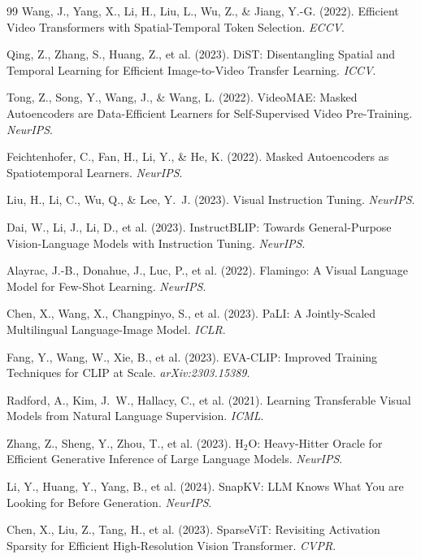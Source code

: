 \documentclass{article}
\begin{document}
{\begin{thebibliography}{99}
Wang, J., Yang, X., Li, H., Liu, L., Wu, Z., \& Jiang, Y.-G. (2022). Efficient Video Transformers with Spatial-Temporal Token Selection. \emph{ECCV}.

Qing, Z., Zhang, S., Huang, Z., et al. (2023). DiST: Disentangling Spatial and Temporal Learning for Efficient Image-to-Video Transfer Learning. \emph{ICCV}.

Tong, Z., Song, Y., Wang, J., \& Wang, L. (2022). VideoMAE: Masked Autoencoders are Data-Efficient Learners for Self-Supervised Video Pre-Training. \emph{NeurIPS}.

Feichtenhofer, C., Fan, H., Li, Y., \& He, K. (2022). Masked Autoencoders as Spatiotemporal Learners. \emph{NeurIPS}.

Liu, H., Li, C., Wu, Q., \& Lee, Y.~J. (2023). Visual Instruction Tuning. \emph{NeurIPS}.

Dai, W., Li, J., Li, D., et al. (2023). InstructBLIP: Towards General-Purpose Vision-Language Models with Instruction Tuning. \emph{NeurIPS}.

Alayrac, J.-B., Donahue, J., Luc, P., et al. (2022). Flamingo: A Visual Language Model for Few-Shot Learning. \emph{NeurIPS}.

Chen, X., Wang, X., Changpinyo, S., et al. (2023). PaLI: A Jointly-Scaled Multilingual Language-Image Model. \emph{ICLR}.

Fang, Y., Wang, W., Xie, B., et al. (2023). EVA-CLIP: Improved Training Techniques for CLIP at Scale. \emph{arXiv:2303.15389}.

Radford, A., Kim, J.~W., Hallacy, C., et al. (2021). Learning Transferable Visual Models from Natural Language Supervision. \emph{ICML}.

Zhang, Z., Sheng, Y., Zhou, T., et al. (2023). H$_2$O: Heavy-Hitter Oracle for Efficient Generative Inference of Large Language Models. \emph{NeurIPS}.

Li, Y., Huang, Y., Yang, B., et al. (2024). SnapKV: LLM Knows What You are Looking for Before Generation. \emph{NeurIPS}.

Chen, X., Liu, Z., Tang, H., et al. (2023). SparseViT: Revisiting Activation Sparsity for Efficient High-Resolution Vision Transformer. \emph{CVPR}.


\end{thebibliography}}
\end{document}
